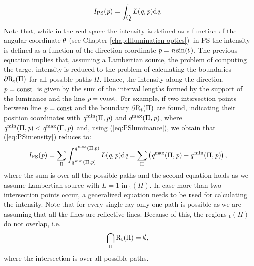 \begin{equation}
\label{eq:PSintensity}
I_{\textrm{PS}}(\textit{p}) = \int_{\mbox{$\textup{Q}_{\textit{}}$}}L(\textit{q}, \textit{p}) \textrm{d}\textit{q}.
\end{equation}
Note that, while in the real space the intensity is defined as a function of the angular coordinate $\theta$ (see Chapter \ref{chap:Illumination optics}), in PS the intensity is defined as a function of the direction coordinate $\textit{p}=\textit{n}\sin(\theta)$. The previous equation implies that, assuming a Lambertian source, the problem of computing the target intensity is reduced to the problem of calculating the boundaries
$\partial\mbox{$\textup{R}$}_\textrm{t}(\Pi)$ for all possible paths $\Pi$. Hence, the intensity along the direction $\textit{p}= \textrm{const.}$ is given by the sum of the interval lengths formed by the support of the luminance and the line $\textit{p}=\textrm{const.}$ For example, if two intersection points between line $\textit{p}= \textrm{const}$ and the boundary $\partial\mbox{$\textup{R}$}_\textrm{t}(\Pi)$ are found, indicating their position coordinates with $\textit{q}^\textrm{min}(\Pi,\textit{p})$ and $\textit{q}^\textrm{max}(\Pi,\textit{p})$, where $\textit{q}^\textrm{min}(\Pi,\textit{p})<\textit{q}^\textrm{max}(\Pi,\textit{p})$ and, using (\ref{eq:PSluminance}), we obtain that (\ref{eq:PSintensity}) reduces to:
\begin{equation}\label{eta2}
I_{\textrm{PS}}(\textit{p}) = \sum_{\Pi}\int_{\textit{q}^\textrm{\,min}(\Pi, \textit{p})}^{\textit{q}^\textrm{\,max}(\Pi,\textit{p})}L(\textit{q}, \textit{p})\textrm{d}\textit{q} = \sum_{\Pi}\big (\textit{q}^\textrm{max}(\Pi,\textit{p})-\textit{q}^\textrm{\,min}(\Pi,\textit{p})\big )\,,
\end{equation}
where the sum is over all the possible paths and the second equation holds as we assume Lambertian source with $L=1$ in $_\textrm{t}(\Pi).$ In case more than two intersection points occur, a generalized equation needs to be used for calculating the intensity. 
Note that for every single ray only one path is possible as we are assuming that all the lines are reflective lines.
Because of this, the regions $_\textrm{t}(\Pi)$ do not overlap, i.e.
\begin{equation}
\bigcap_{\Pi}\mbox{$\textup{R}$}_\textrm{t}(\Pi)= \emptyset,
\end{equation}
where the intersection is over all possible paths. \\ \indent
